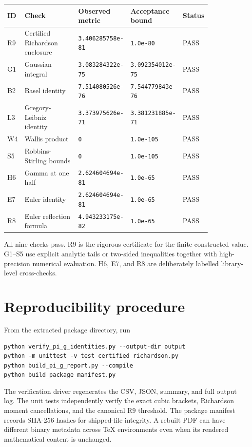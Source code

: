 \documentclass[11pt]{article}
\begin{document}
\begin{longtable}{p{0.06\linewidth}p{0.29\linewidth}p{0.20\linewidth}p{0.20\linewidth}p{0.08\linewidth}}
\toprule
ID & Check & Observed metric & Acceptance bound & Status \\
\midrule
\endhead
R9 & Certified Richardson enclosure & \texttt{3.406285758e-81} & \texttt{1.0e-80} & PASS \\
G1 & Gaussian integral & \texttt{3.083284322e-75} & \texttt{3.092354012e-75} & PASS \\
B2 & Basel identity & \texttt{7.514080526e-76} & \texttt{7.544779843e-76} & PASS \\
L3 & Gregory-Leibniz identity & \texttt{3.373975626e-71} & \texttt{3.381231885e-71} & PASS \\
W4 & Wallis product & \texttt{0} & \texttt{1.0e-105} & PASS \\
S5 & Robbins-Stirling bounds & \texttt{0} & \texttt{1.0e-105} & PASS \\
H6 & Gamma at one half & \texttt{2.624604694e-81} & \texttt{1.0e-65} & PASS \\
E7 & Euler identity & \texttt{2.624604694e-81} & \texttt{1.0e-65} & PASS \\
R8 & Euler reflection formula & \texttt{4.943233175e-82} & \texttt{1.0e-65} & PASS \\
\bottomrule
\end{longtable}

All nine checks pass.  R9 is the rigorous certificate for the finite constructed value.  G1--S5 use explicit analytic tails or two-sided inequalities together with high-precision numerical evaluation.  H6, E7, and R8 are deliberately labelled library-level cross-checks.

\section{Reproducibility procedure}

From the extracted package directory, run
\begin{verbatim}
python verify_pi_g_identities.py --output-dir output
python -m unittest -v test_certified_richardson.py
python build_pi_g_report.py --compile
python build_package_manifest.py
\end{verbatim}

The verification driver regenerates the CSV, JSON, summary, and full output log.  The unit tests independently verify the exact cubic brackets, Richardson moment cancellations, and the canonical R9 threshold.  The package manifest records SHA-256 hashes for shipped-file integrity.  A rebuilt PDF can have different binary metadata across TeX environments even when its rendered mathematical content is unchanged.
\end{document}
